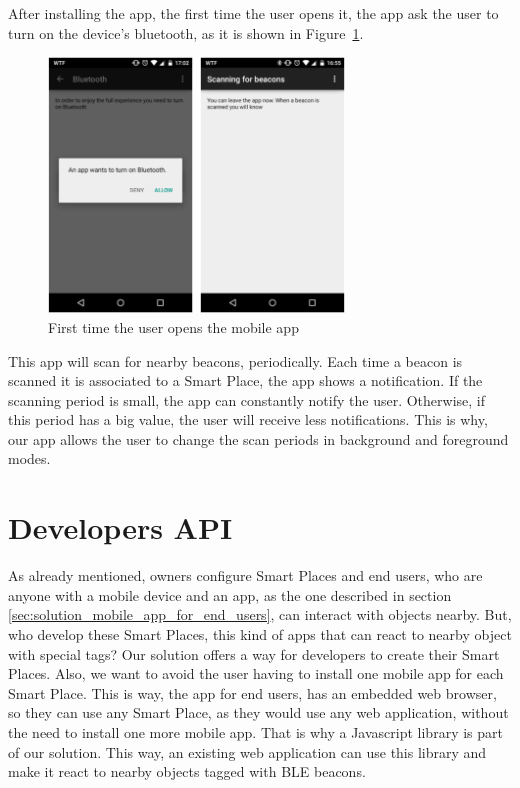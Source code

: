 After installing the app, the first time the user opens it, the app ask the user to turn on the device's bluetooth, as it is shown in Figure~\ref{fig:screenshot_clientapp_entry}.
\begin{figure}[!ht]
  \centering
    \includegraphics[width=0.7\textwidth, keepaspectratio]{images/screenshots/clientapp_entry}
    \caption{First time the user opens the mobile app}
    \label{fig:screenshot_clientapp_entry}
\end{figure}
This app will scan for nearby beacons, periodically.
Each time a beacon is scanned it is associated to a Smart Place, the app shows a notification.
If the scanning period is small, the app can constantly notify the user. Otherwise, if this period has a big value, the user will receive less notifications.
This is why, our app allows the user to change the scan periods in background and foreground modes.

\section{Developers API}
\label{sec:solution_developers_api}
As already mentioned, owners configure Smart Places and end users, who are anyone with a mobile device and an app, as the one described in section \ref{sec:solution_mobile_app_for_end_users}, can interact with objects nearby.
But, who develop these Smart Places, this kind of apps that can react to nearby object with special tags?
Our solution offers a way for developers to create their Smart Places.
Also, we want to avoid the user having to install one mobile app for each Smart Place.
This is way, the app for end users,
has an embedded web browser, so they can use any Smart Place, as they would use any web application, without the need to install one more mobile app.
That is why a Javascript library is part of our solution.
This way, an existing web application can use this library and make it react to nearby objects tagged with \gls{BLE} beacons.

